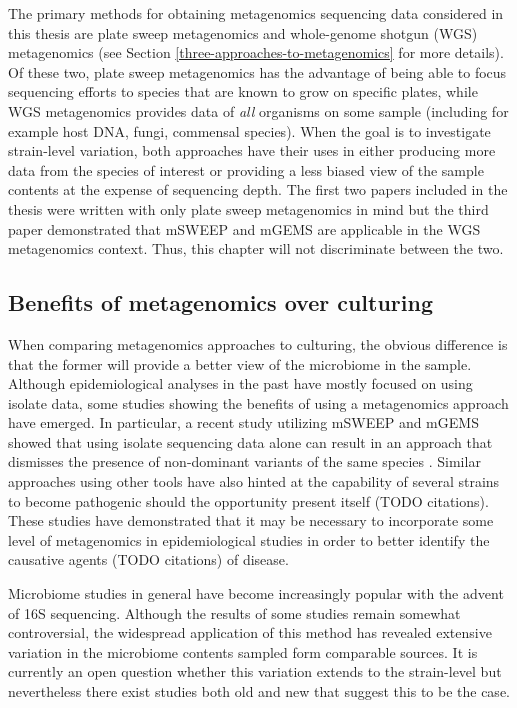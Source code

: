 \documentclass[officiallayout]{tktla}
\begin{document}
The primary methods for obtaining metagenomics sequencing data
considered in this thesis are plate sweep metagenomics and
whole-genome shotgun (WGS) metagenomics (see Section
\ref{three-approaches-to-metagenomics} for more details). Of these
two, plate sweep metagenomics has the advantage of being able to focus
sequencing efforts to species that are known to grow on specific
plates, while WGS metagenomics provides data of \textit{all} organisms
on some sample (including for example host DNA, fungi, commensal
species). When the goal is to investigate strain-level variation, both
approaches have their uses in either producing more data from the
species of interest or providing a less biased view of the sample
contents at the expense of sequencing depth. The first two papers
included in the thesis were written with only plate sweep metagenomics
in mind but the third paper demonstrated that mSWEEP and mGEMS are
applicable in the WGS metagenomics context. Thus, this chapter will
not discriminate between the two.

\subsection{Benefits of metagenomics over culturing}

When comparing metagenomics approaches to culturing, the obvious
difference is that the former will provide a better view of the
microbiome in the sample. Although epidemiological analyses in the
past have mostly focused on using isolate data, some studies showing
the benefits of using a metagenomics approach have emerged. In
particular, a recent study utilizing mSWEEP and mGEMS showed that
using isolate sequencing data alone can result in an approach that
dismisses the presence of non-dominant variants of the same species
\citep{tonkin-hill_pneumococcal_2022}. Similar approaches using other
tools have also hinted at the capability of several strains to become
pathogenic should the opportunity present itself (TODO
citations). These studies have demonstrated that it may be necessary
to incorporate some level of metagenomics in epidemiological studies
in order to better identify the causative agents (TODO citations) of
disease.

Microbiome studies in general have become increasingly popular with
the advent of 16S sequencing. Although the results of some studies
remain somewhat controversial, the widespread application of this
method has revealed extensive variation in the microbiome contents
sampled form comparable sources. It is currently an open question
whether this variation extends to the strain-level but nevertheless
there exist studies both old and new that suggest this to be the
case.
\end{document}
